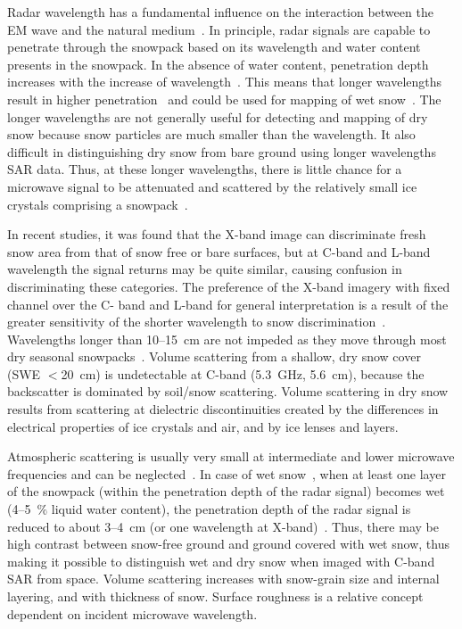 \begin{description}
	Radar wavelength has a fundamental influence on the interaction between the EM wave and the natural medium~\citep{garestier2006polinsar}. In principle, radar signals are capable to penetrate through the snowpack based on its wavelength and water content presents in the snowpack. In the absence of water content, penetration depth increases with the increase of wavelength~\citep{singh2009snow}. This means that longer wavelengths result in higher penetration~\citep{Campbell2002A} and could be used for mapping of wet snow~\citep{rott1993snow,nagler1996methods,shi1994snow,rao2006envisat}. The longer wavelengths are not generally useful for detecting and mapping of dry snow because snow particles are much smaller than the wavelength. It also difficult in distinguishing dry snow from bare ground using longer wavelengths SAR data. Thus, at these longer wavelengths, there is little chance for a microwave signal to be attenuated and scattered by the relatively small ice crystals comprising a snowpack~\citep{watte1970snowfield,ulaby1980active,ulaby1981microwave}. 
	
	In recent studies, it was found that the X-band image can discriminate fresh snow area from that of snow free or bare surfaces, but at C-band and L-band wavelength the signal returns may be quite similar, causing confusion in discriminating these categories. The preference of the X-band imagery with fixed channel over the C- band and L-band for general interpretation is a result of the greater sensitivity of the shorter wavelength to snow discrimination~\citep{venkataraman2008snow}. Wavelengths longer than 10–15~cm are not impeded as they move through most dry seasonal snowpacks~\citep{bernier1987microwave,bernier1998potential}. Volume scattering from a shallow, dry snow cover (SWE $<$20~cm) is undetectable at C-band (5.3~GHz, 5.6~cm), because the backscatter is dominated by soil/snow scattering. Volume scattering in dry snow results from scattering at dielectric discontinuities created by the differences in electrical properties of ice crystals and air, and by ice lenses and layers. 
		
	Atmospheric scattering is usually very small at intermediate and lower microwave frequencies and can be neglected~\citep{ulaby1980active,leconte1990preliminary,leconte1996exploring}. In case of wet snow~\citep{stiles1980dielectric,ulaby1980active,ulaby1986microwave}, when at least one layer of the snowpack (within the penetration depth of the radar signal) becomes wet (4–5~$\%$ liquid water content), the penetration depth of the radar signal is reduced to about 3–4~cm (or one wavelength at X-band)~\citep{matzler1984snow}. Thus, there may be high contrast between snow-free ground and ground covered with wet snow, thus making it possible to distinguish wet and dry snow when imaged with C-band SAR from space. Volume scattering increases with snow-grain size and internal layering, and with thickness of snow. Surface roughness is a relative concept dependent on incident microwave wavelength. 
	

\end{description}
